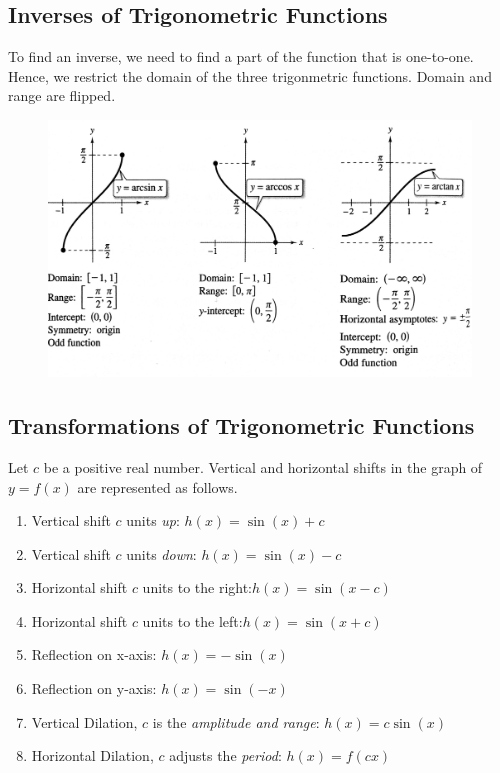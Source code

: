 \subsection{Inverses of Trigonometric Functions}
To find an inverse, we need to find a part of the function that is one-to-one. Hence, we restrict the domain of the three trigonmetric functions. Domain and range are flipped.

	      \begin{figure}[H]
	      	\centering
	      	\includegraphics[width=14cm]{triginverse}
	      \end{figure}


\subsection{Transformations of Trigonometric Functions}
Let \(c\) be a positive real number. Vertical and horizontal shifts in the graph of
\(y=f(x)\) are represented as follows.
\begin{enumerate}
	\item Vertical shift \(c\) units \emph{up}: \quad \(h(x)=\sin(x) + c\)
	\item Vertical shift \(c\) units \emph{down}: \quad \(h(x)=\sin(x) - c\)
	\item Horizontal shift \(c\) units to the right:\quad \(h(x)=\sin(x-c)\)
	\item Horizontal shift \(c\) units to the left:\quad  \(h(x)=\sin(x+c)\)
	\item Reflection on x-axis: \quad \(h(x)=-\sin(x)\)
	\item Reflection on y-axis: \quad \(h(x)=\sin(-x)\)
	\item Vertical Dilation, \(c\) is the \emph{amplitude and range}: \quad  \( h(x) = c \sin(x)\)
	\item Horizontal Dilation, \(c\) adjusts the \emph{period}: \quad \(h(x)=f(cx)\)
\end{enumerate}

